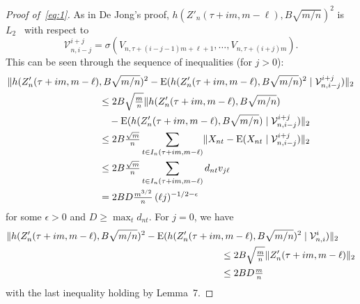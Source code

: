 \documentclass[11pt]{article}
\begin{document}
{\begin{proof}[Proof of~\eqref{eq:1}]
  As in De Jong's proof,
  $h(Z'_n(\tau + im, m-\ell), B \sqrt{m / n})^2$
  is $L_2$ \ned\ with respect to
  \begin{equation*}
    \mathcal{V}_{n,i-j}^{i+j} =
    \sigma(V_{n,\tau + (i-j-1)m + \ell + 1},\dots,
             V_{n,\tau + (i+j)m}).
  \end{equation*}
  This can be seen through the sequence of inequalities (for $j > 0$):
  \begin{align*}
    \lVert h(Z'_n(\tau + im, m-\ell)&, B \sqrt{m / n})^2
    - \operatorname{E}(h(Z'_n(\tau + im, m-\ell), B \sqrt{m / n})^2 \mid
         \mathcal{V}_{n,i-j}^{i+j}) \rVert_2 \\
    & \leq 2 B \sqrt{\tfrac{m}{n}}
    \lVert h(Z'_n(\tau + im, m-\ell), B \sqrt{m / n}) \\
    &\quad- \operatorname{E}(h(Z'_n(\tau + im, m-\ell), B \sqrt{m / n}) \mid
         \mathcal{V}_{n,i-j}^{i+j}) \rVert_2 \\
    &\leq 2 B \tfrac{\sqrt{m}}{n}
    \sum_{t \in I_n(\tau + im, m - \ell)}
    \lVert X_{nt} - \operatorname{E}(X_{nt} \mid \mathcal{V}_{n,i-j}^{i+j}) \rVert_2 \\
    & \leq 2 B \tfrac{\sqrt{m}}{n}
    \sum_{t \in I_n(\tau + im, m - \ell)} d_{nt} v_{j\ell} \\
    &= 2 B D \tfrac{m^{3/2}}{n} \, (\ell j)^{-1/2 - \epsilon}
  \end{align*}
  for some $\epsilon > 0$ and $D \geq \max_t d_{nt}$. For $j = 0$,
  we have
  \begin{align*}
    \lVert h(Z'_n(\tau + im, m-\ell), B \sqrt{m / n})^2
    - \operatorname{E}(h(Z'_n(\tau + im&, m-\ell), B \sqrt{m / n})^2 \mid
         \mathcal{V}_{n,i}^{i}) \rVert_2 \\
    & \leq 2 B \sqrt{\tfrac{m}{n}} \lVert Z'_n(\tau + im, m - \ell) \rVert_2 \\
    & \leq 2 B D \tfrac{m}{n}
  \end{align*}
  with the last inequality holding by Lemma~7.


\end{proof}}
\end{document}
